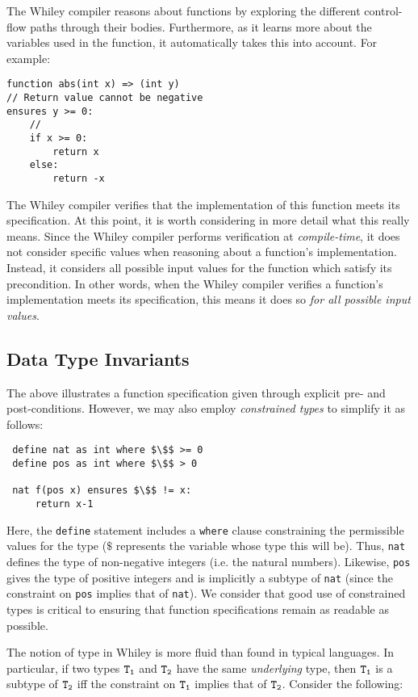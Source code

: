 The Whiley compiler reasons about functions by exploring the different
control-flow paths through their bodies.  Furthermore, as it learns
more about the variables used in the function, it automatically takes
this into account.  For example:
\begin{lstlisting}
function abs(int x) => (int y)
// Return value cannot be negative
ensures y >= 0:
    //
    if x >= 0:
        return x
    else:
        return -x
\end{lstlisting}
The Whiley compiler verifies that the implementation of this function
meets its specification.  At this point, it is worth considering in
more detail what this really means.  Since the Whiley compiler
performs verification at {\em compile-time}, it does not consider
specific values when reasoning about a function's implementation.
Instead, it considers all possible input values for the function which
satisfy its precondition.  In other words, when the Whiley compiler
verifies a function's implementation meets its specification, this
means it does so {\em for all possible input values}.  

\subsection{Data Type Invariants}

The above illustrates a function specification given through explicit pre- and
post-conditions.  However, we may also employ {\em constrained types}
to simplify it as follows:

\begin{lstlisting}
 define nat as int where $\$$ >= 0
 define pos as int where $\$$ > 0

 nat f(pos x) ensures $\$$ != x:
     return x-1
\end{lstlisting}

Here, the \lstinline{define} statement includes a \lstinline{where}
clause constraining the permissible values for the type ($\$$
represents the variable whose type this will be).  Thus,
\lstinline{nat} defines the type of non-negative integers (i.e. the
natural numbers).  Likewise, \lstinline{pos} gives the type of
positive integers and is implicitly a subtype of \lstinline{nat}
(since the constraint on \lstinline{pos} implies that of
\lstinline{nat}).  We consider that good use of constrained types is
critical to ensuring that function specifications remain as readable
as possible.

The notion of type in Whiley is more fluid than found in typical
languages.  In particular, if two types ${\tt T_1}$ and ${\tt T_2}$
have the same {\em underlying} type, then ${\tt T_1}$ is a subtype of
${\tt T_2}$ iff the constraint on ${\tt T_1}$ implies that of ${\tt
  T_2}$.  Consider the following:


